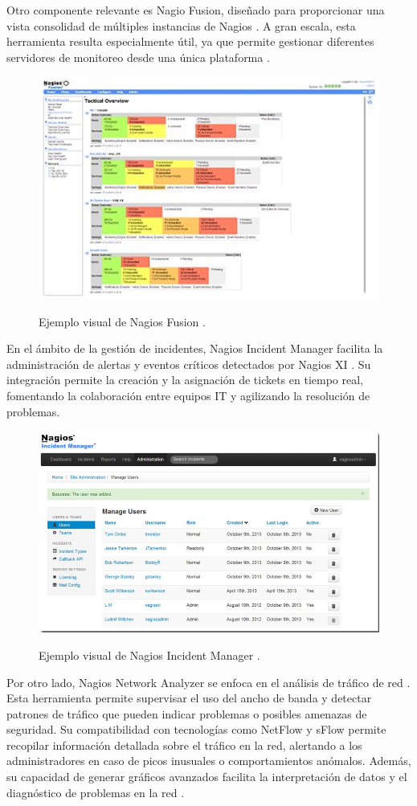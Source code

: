 Otro componente relevante es Nagio Fusion, diseñado para proporcionar una vista consolidad de múltiples instancias de Nagios \citep{nagios2014}. A gran escala, esta herramienta resulta especialmente útil, ya que permite gestionar diferentes servidores de monitoreo desde una única plataforma \citep{nagios2014}.

\begin{figure}[H]
    \centering
    {\includegraphics[width=0.7\linewidth]{imagenes/image3.png}}
    \caption{Ejemplo visual de Nagios Fusion \citep{nagios2014}.}
    \label{fig:enter-label}
\end{figure}

En el ámbito de la gestión de incidentes, Nagios Incident Manager facilita  la administración de alertas y eventos críticos detectados por Nagios XI \citep{nagios2014}. Su integración permite la creación y la asignación de tickets en tiempo real, fomentando la colaboración entre equipos IT y agilizando la resolución de problemas.

\begin{figure}[H]
    \centering
    {\includegraphics[width=0.7\linewidth]{imagenes/image4.png}}
    \caption{Ejemplo visual de Nagios Incident Manager \citep{nagios2014}.}
    \label{fig:enter-label}
\end{figure}

Por otro lado, Nagios Network Analyzer se enfoca en el análisis de tráfico de red \citep{nagios2014}. Esta herramienta permite supervisar el uso del ancho de banda y detectar patrones de tráfico que pueden indicar problemas o posibles amenazas de seguridad. Su compatibilidad con tecnologías como NetFlow y sFlow permite recopilar información detallada sobre el tráfico en la red, alertando a los administradores en caso de picos inusuales o comportamientos anómalos. Además, su capacidad de generar gráficos avanzados facilita la interpretación de datos y el diagnóstico de problemas en la red \citep{nagios2014}.

